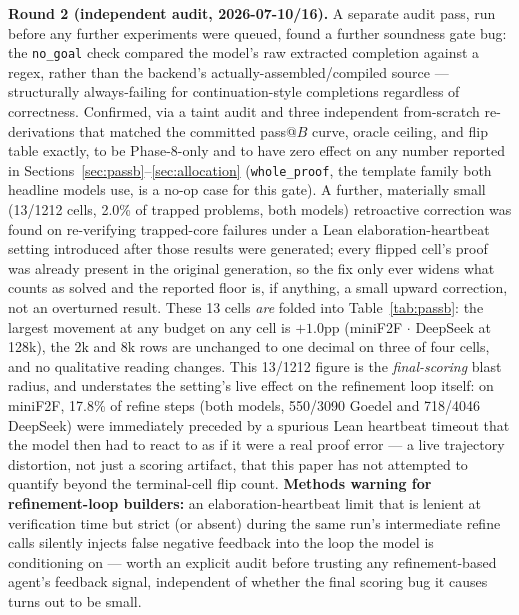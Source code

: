\documentclass{article}
\begin{document}
\textbf{Round 2 (independent audit, 2026-07-10/16).} A separate audit pass, run before any further
experiments were queued, found a further soundness gate bug: the \texttt{no\_goal} check compared the
model's raw extracted completion against a regex, rather than the backend's actually-assembled/compiled
source --- structurally always-failing for continuation-style completions regardless of correctness.
Confirmed, via a taint audit and three independent from-scratch re-derivations that matched the
committed pass@$B$ curve, oracle ceiling, and flip table exactly, to be Phase-8-only and to have zero
effect on any number reported in Sections~\ref{sec:passb}--\ref{sec:allocation}
(\texttt{whole\_proof}, the template family both headline models use, is a no-op case for this gate).
A further, materially small (13/1212 cells, 2.0\% of trapped problems, both models) retroactive
correction was found on re-verifying trapped-core failures under a Lean elaboration-heartbeat setting
introduced after those results were generated; every flipped cell's proof was already present in the
original generation, so the fix only ever widens what counts as solved and the reported floor is, if
anything, a small upward correction, not an overturned result. These 13 cells \emph{are} folded into
Table~\ref{tab:passb}: the largest movement at any budget on any cell is $+1.0$pp (miniF2F
$\cdot$ DeepSeek at 128k), the 2k and 8k rows are unchanged to one decimal on three of four cells,
and no qualitative reading changes. This 13/1212
figure is the \emph{final-scoring} blast radius, and understates the setting's live effect on the
refinement loop itself: on miniF2F, 17.8\% of refine steps (both models, 550/3090 Goedel and
718/4046 DeepSeek) were immediately preceded by a spurious Lean heartbeat timeout that the
model then had to react to as if it were a real proof error --- a live trajectory distortion, not
just a scoring artifact, that this paper has not attempted to quantify beyond the terminal-cell flip
count. \textbf{Methods warning for refinement-loop builders:} an elaboration-heartbeat limit that is
lenient at verification time but strict (or absent) during the same run's intermediate refine calls
silently injects false negative feedback into the loop the model is conditioning on --- worth an
explicit audit before trusting any refinement-based agent's feedback signal, independent of whether
the final scoring bug it causes turns out to be small.
\end{document}
